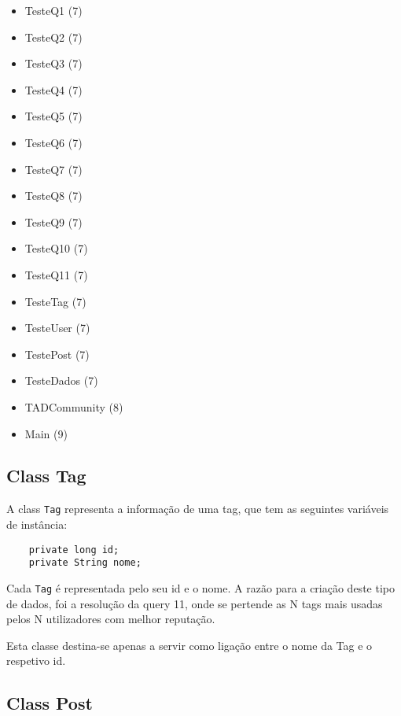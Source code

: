 \documentclass[11pt,a4paper]{article}
\begin{document}
\begin{itemize}
	\item TesteQ1                             (7)
	\item TesteQ2                             (7)
	\item TesteQ3                             (7)
	\item TesteQ4           	              (7)
	\item TesteQ5                             (7)
	\item TesteQ6                             (7)
	\item TesteQ7   	                      (7)
	\item TesteQ8                             (7)
	\item TesteQ9                             (7)
	\item TesteQ10                            (7)
	\item TesteQ11                            (7)
	\item TesteTag                            (7)
    \item TesteUser                           (7)
    \item TestePost                           (7)
    \item TesteDados                          (7)
    \item TADCommunity                        (8)
    \item Main                                (9)
\end{itemize}

\subsection{Class Tag}

A class \texttt{Tag} representa a informação de uma tag, que tem as seguintes variáveis de instância:
\begin{verbatim}
    private long id;
    private String nome;
\end{verbatim}

Cada \texttt{Tag} é representada pelo seu id e o nome. A razão para a criação deste tipo de dados, foi a resolução da query 11, onde se pertende as N tags mais usadas pelos N utilizadores com melhor reputação.\newline

Esta classe destina-se apenas a servir como ligação entre o nome da Tag e o respetivo id.

\subsection{Class Post}
\end{document}
